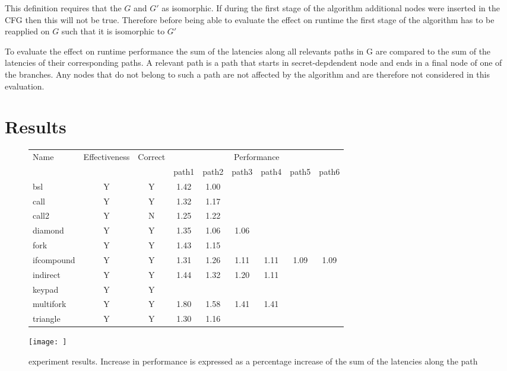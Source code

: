 This definition requires that the $G$ and $G'$ as isomorphic. If during the first stage of the algorithm additional nodes were inserted in the CFG
then this will not be true. Therefore before being able to evaluate the effect on runtime the first stage of the algorithm has to be reapplied on $G$ such 
that it is isomorphic to $G'$

To evaluate the effect on runtime performance the sum of the latencies along all relevants paths in G are compared to the sum of the latencies of their corresponding paths. A relevant path is a path that starts in secret-depdendent node and ends in a final node of one of the branches. Any nodes that do not belong to such a path 
are not affected by the algorithm and are therefore not considered in this evaluation. 

    
\section{Results}

\begin{figure}
    \centering
    \begin{tabular}{ l | c | c | c c c c c c }
    Name & Effectiveness & Correct & \multicolumn{6}{c}{Performance} \\ 
     & & & path1 & path2 & path3 & path4 & path5 & path6\\
     \hline 
    bsl         & Y & Y & 1.42 & 1.00 & & & &  \\ 
    call        & Y & Y & 1.32 & 1.17 & &  & & \\  
    call2       & Y & N & 1.25 & 1.22 & &  & & \\
    diamond     & Y & Y & 1.35 & 1.06 & 1.06 & & &  \\ 
    fork        & Y & Y & 1.43 & 1.15 & & & &  \\  
    ifcompound  & Y & Y & 1.31 & 1.26 & 1.11 & 1.11 & 1.09 & 1.09  \\
    indirect    & Y & Y & 1.44 & 1.32 & 1.20 & 1.11 & & \\ 
    keypad      & Y & Y &  &  &  &  &  &   \\  
    multifork   & Y & Y & 1.80 & 1.58 & 1.41 & 1.41 & &   \\
    triangle    & Y & Y & 1.30 & 1.16 & & & &  \\
    \end{tabular}
    \texttt{[image: ]}
    \caption{experiment results. Increase in performance is expressed as a percentage increase of the sum of the latencies along the path}
    \label{fig:experiment results }
\end{figure}

